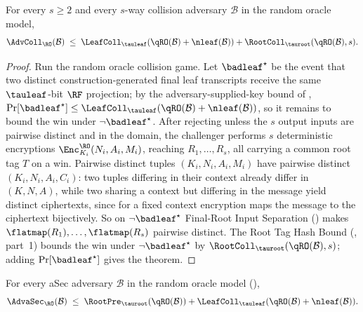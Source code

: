 \begin{theorem}
\label{thm:coll-ro}
For every $s \geq 2$ and every $s$-way collision
adversary $\mathcal{B}$ in the \TW{} random oracle model,
\[
  \AdvColl_{\RO}(\mathcal{B})
  \;\leq\;
  \LeafColl_{\tauleaf}(\qRO(\mathcal{B})+\nleaf(\mathcal{B}))
  + \RootColl_{\tauroot}(\qRO(\mathcal{B}), s).
\]
\end{theorem}

\begin{proof}
Run the random oracle collision game. Let $\badleaf^\star$ be the event
that two distinct construction-generated final leaf transcripts receive
the same $\tauleaf$-bit $\RF$ projection; by the adversary-supplied-key
bound of ,
$\Pr[\badleaf^\star] \leq \LeafColl_{\tauleaf}(\qRO(\mathcal{B})+\nleaf(\mathcal{B}))$,
so it remains to bound the win under $\neg\badleaf^\star$. After rejecting
unless the $s$ output inputs are pairwise distinct and in the \TW{}
domain, the challenger performs $s$ deterministic encryptions
$\Enc_{K_i}^{\RO}(N_i,A_i,M_i)$, reaching $R_1,\dots,R_s$, all carrying a
common root tag $T$ on a win. Pairwise distinct tuples $(K_i,N_i,A_i,M_i)$
have pairwise distinct $(K_i,N_i,A_i,C_i)$: two tuples differing in their
context already differ in $(K,N,A)$, while two sharing a context but
differing in the message yield distinct ciphertexts, since for a fixed
context encryption maps the message to the ciphertext bijectively. So on
$\neg\badleaf^\star$ Final-Root Input Separation
() makes $\flatmap(R_1),\dots,\flatmap(R_s)$
pairwise distinct. The Root Tag Hash Bound (,
part~1) bounds the win under $\neg\badleaf^\star$ by
$\RootColl_{\tauroot}(\qRO(\mathcal{B}),s)$; adding $\Pr[\badleaf^\star]$
gives the theorem.
\end{proof}

\begin{theorem}
\label{thm:asec-ro}
For every aSec adversary $\mathcal{B}$ in the \TW{} random oracle model
(),
\[
  \AdvaSec_\RO(\mathcal{B})
  \;\leq\;
  \RootPre_{\tauroot}(\qRO(\mathcal{B}))
  + \LeafColl_{\tauleaf}(\qRO(\mathcal{B})+\nleaf(\mathcal{B})).
\]
\end{theorem}

